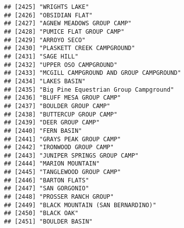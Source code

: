 \documentclass[
]{article}
\begin{document}
\begin{verbatim}
## [2425] "WRIGHTS LAKE"                                                                        
## [2426] "OBSIDIAN FLAT"                                                                       
## [2427] "AGNEW MEADOWS GROUP CAMP"                                                            
## [2428] "PUMICE FLAT GROUP CAMP"                                                              
## [2429] "ARROYO SECO"                                                                         
## [2430] "PLASKETT CREEK CAMPGROUND"                                                           
## [2431] "SAGE HILL"                                                                           
## [2432] "UPPER OSO CAMPGROUND"                                                                
## [2433] "MCGILL CAMPGROUND AND GROUP CAMPGROUND"                                              
## [2434] "LAKES BASIN"                                                                         
## [2435] "Big Pine Equestrian Group Campground"                                                
## [2436] "BLUFF MESA GROUP CAMP"                                                               
## [2437] "BOULDER GROUP CAMP"                                                                  
## [2438] "BUTTERCUP GROUP CAMP"                                                                
## [2439] "DEER GROUP CAMP"                                                                     
## [2440] "FERN BASIN"                                                                          
## [2441] "GRAYS PEAK GROUP CAMP"                                                               
## [2442] "IRONWOOD GROUP CAMP"                                                                 
## [2443] "JUNIPER SPRINGS GROUP CAMP"                                                          
## [2444] "MARION MOUNTAIN"                                                                     
## [2445] "TANGLEWOOD GROUP CAMP"                                                               
## [2446] "BARTON FLATS"                                                                        
## [2447] "SAN GORGONIO"                                                                        
## [2448] "PROSSER RANCH GROUP"                                                                 
## [2449] "BLACK MOUNTAIN (SAN BERNARDINO)"                                                     
## [2450] "BLACK OAK"                                                                           
## [2451] "BOULDER BASIN"                                                                       

\end{verbatim}
\end{document}
